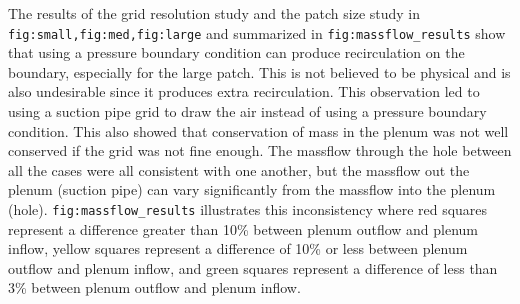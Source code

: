 The results of the grid resolution study and the patch size study in \verb|fig:small,fig:med,fig:large| and summarized in \verb|fig:massflow_results| show that using a pressure boundary condition can produce recirculation on the boundary, especially for the large patch. This is not believed to be physical and is also undesirable since it produces extra recirculation. This observation led to using a suction pipe grid to draw the air instead of using a pressure boundary condition. This also showed that conservation of mass in the plenum was not well conserved if the grid was not fine enough. The massflow through the hole between all the cases were all consistent with one another, but the massflow out the plenum (suction pipe) can vary significantly from the massflow into the plenum (hole). \verb|fig:massflow_results| illustrates this inconsistency where red squares represent a difference greater than 10\% between plenum outflow and plenum inflow, yellow squares represent a difference of 10\% or less between plenum outflow and plenum inflow, and green squares represent a difference of less than 3\% between plenum outflow and plenum inflow.


